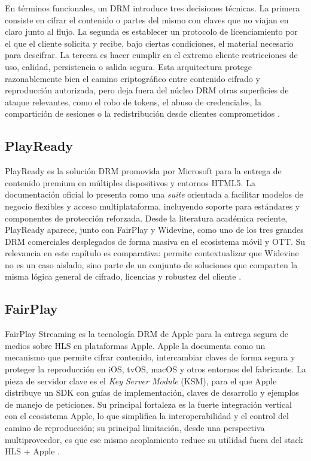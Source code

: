 En términos funcionales, un DRM introduce tres decisiones técnicas. La primera consiste en cifrar el contenido o partes del mismo con claves que no viajan en claro junto al flujo. La segunda es establecer un protocolo de licenciamiento por el que el cliente solicita y recibe, bajo ciertas condiciones, el material necesario para descifrar. La tercera es hacer cumplir en el extremo cliente restricciones de uso, calidad, persistencia o salida segura. Esta arquitectura protege razonablemente bien el camino criptográfico entre contenido cifrado y reproducción autorizada, pero deja fuera del núcleo DRM otras superficies de ataque relevantes, como el robo de tokens, el abuso de credenciales, la compartición de sesiones o la redistribución desde clientes comprometidos \cite{w3ceme2026,rafi2023mobiledrm,patat2022}.

\subsection{PlayReady}

PlayReady es la solución DRM promovida por Microsoft para la entrega de contenido premium en múltiples dispositivos y entornos HTML5. La documentación oficial lo presenta como una \textit{suite} orientada a facilitar modelos de negocio flexibles y acceso multiplataforma, incluyendo soporte para estándares y componentes de protección reforzada. Desde la literatura académica reciente, PlayReady aparece, junto con FairPlay y Widevine, como uno de los tres grandes DRM comerciales desplegados de forma masiva en el ecosistema móvil y OTT. Su relevancia en este capítulo es comparativa: permite contextualizar que Widevine no es un caso aislado, sino parte de un conjunto de soluciones que comparten la misma lógica general de cifrado, licencias y robustez del cliente \cite{microsoft-playready,rafi2023mobiledrm}.

\subsection{FairPlay}

FairPlay Streaming es la tecnología DRM de Apple para la entrega segura de medios sobre HLS en plataformas Apple. Apple la documenta como un mecanismo que permite cifrar contenido, intercambiar claves de forma segura y proteger la reproducción en iOS, tvOS, macOS y otros entornos del fabricante. La pieza de servidor clave es el \textit{Key Server Module} (KSM), para el que Apple distribuye un SDK con guías de implementación, claves de desarrollo y ejemplos de manejo de peticiones. Su principal fortaleza es la fuerte integración vertical con el ecosistema Apple, lo que simplifica la interoperabilidad y el control del camino de reproducción; su principal limitación, desde una perspectiva multiproveedor, es que ese mismo acoplamiento reduce su utilidad fuera del stack HLS + Apple \cite{apple-fps,rafi2023mobiledrm}.

